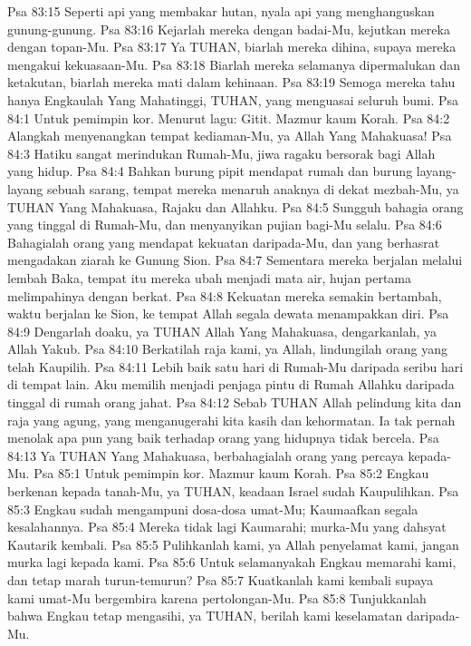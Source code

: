 Psa 83:15  Seperti api yang membakar hutan, nyala api yang menghanguskan gunung-gunung.
Psa 83:16  Kejarlah mereka dengan badai-Mu, kejutkan mereka dengan topan-Mu.
Psa 83:17  Ya TUHAN, biarlah mereka dihina, supaya mereka mengakui kekuasaan-Mu.
Psa 83:18  Biarlah mereka selamanya dipermalukan dan ketakutan, biarlah mereka mati dalam kehinaan.
Psa 83:19  Semoga mereka tahu hanya Engkaulah Yang Mahatinggi, TUHAN, yang menguasai seluruh bumi.
Psa 84:1  Untuk pemimpin kor. Menurut lagu: Gitit. Mazmur kaum Korah.
Psa 84:2  Alangkah menyenangkan tempat kediaman-Mu, ya Allah Yang Mahakuasa!
Psa 84:3  Hatiku sangat merindukan Rumah-Mu, jiwa ragaku bersorak bagi Allah yang hidup.
Psa 84:4  Bahkan burung pipit mendapat rumah dan burung layang-layang sebuah sarang, tempat mereka menaruh anaknya di dekat mezbah-Mu, ya TUHAN Yang Mahakuasa, Rajaku dan Allahku.
Psa 84:5  Sungguh bahagia orang yang tinggal di Rumah-Mu, dan menyanyikan pujian bagi-Mu selalu.
Psa 84:6  Bahagialah orang yang mendapat kekuatan daripada-Mu, dan yang berhasrat mengadakan ziarah ke Gunung Sion.
Psa 84:7  Sementara mereka berjalan melalui lembah Baka, tempat itu mereka ubah menjadi mata air, hujan pertama melimpahinya dengan berkat.
Psa 84:8  Kekuatan mereka semakin bertambah, waktu berjalan ke Sion, ke tempat Allah segala dewata menampakkan diri.
Psa 84:9  Dengarlah doaku, ya TUHAN Allah Yang Mahakuasa, dengarkanlah, ya Allah Yakub.
Psa 84:10  Berkatilah raja kami, ya Allah, lindungilah orang yang telah Kaupilih.
Psa 84:11  Lebih baik satu hari di Rumah-Mu daripada seribu hari di tempat lain. Aku memilih menjadi penjaga pintu di Rumah Allahku daripada tinggal di rumah orang jahat.
Psa 84:12  Sebab TUHAN Allah pelindung kita dan raja yang agung, yang menganugerahi kita kasih dan kehormatan. Ia tak pernah menolak apa pun yang baik terhadap orang yang hidupnya tidak bercela.
Psa 84:13  Ya TUHAN Yang Mahakuasa, berbahagialah orang yang percaya kepada-Mu.
Psa 85:1  Untuk pemimpin kor. Mazmur kaum Korah.
Psa 85:2  Engkau berkenan kepada tanah-Mu, ya TUHAN, keadaan Israel sudah Kaupulihkan.
Psa 85:3  Engkau sudah mengampuni dosa-dosa umat-Mu; Kaumaafkan segala kesalahannya.
Psa 85:4  Mereka tidak lagi Kaumarahi; murka-Mu yang dahsyat Kautarik kembali.
Psa 85:5  Pulihkanlah kami, ya Allah penyelamat kami, jangan murka lagi kepada kami.
Psa 85:6  Untuk selamanyakah Engkau memarahi kami, dan tetap marah turun-temurun?
Psa 85:7  Kuatkanlah kami kembali supaya kami umat-Mu bergembira karena pertolongan-Mu.
Psa 85:8  Tunjukkanlah bahwa Engkau tetap mengasihi, ya TUHAN, berilah kami keselamatan daripada-Mu.

